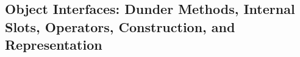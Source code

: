 \subsection{Object Interfaces: Dunder Methods, Internal Slots, Operators, Construction, and Representation}
